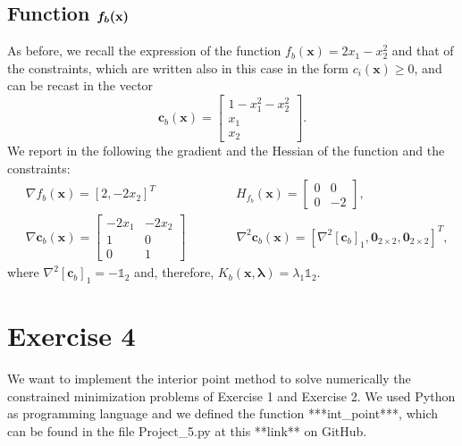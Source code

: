 \documentclass[a4paper,11pt]{article}
\begin{document}
\subsection*{Function $\boldmath{f_{b}}(\textbf{x})$}
As before, we recall the expression of the function $f_{b}(\textbf{x}) = 2x_{1} - x_{2}^{2}$ and that of the constraints, which are written also in this case in the form $c_{i}(\textbf{x})\ge0$, and can be recast in the vector
\begin{equation}
	\textbf{c}_{b}(\textbf{x}) = 
	\begin{bmatrix}
		1 -x_{1}^{2} - x_2^{2}\\
		x_1\\
		x_2
	\end{bmatrix}.
\end{equation}
We report in the following the gradient and the Hessian of the function and the constraints:
\begin{align}
	& \nabla f_{b}(\textbf{x}) = [2, -2x_{2}]^{T} \qquad \qquad \qquad \ \ H_{f_{b}}(\textbf{x}) = \begin{bmatrix}
		0 & 0 \\
		0 & -2
	\end{bmatrix}, \\
	& \nabla \textbf{c}_{b}(\textbf{x}) = \begin{bmatrix}
		-2x_{1} & - 2x_{2}\\
		1 & 0 \\
		0 & 1
	\end{bmatrix} \qquad \qquad \nabla^{2}{\textbf{c}_{b}}(\textbf{x}) =  \left[\nabla^{2}[\textbf{c}_{b}]_{1},\textbf{0}_{2\times2},\textbf{0}_{2\times2}\right]^{T},
\end{align}
where $\nabla^{2}[\textbf{c}_{b}]_{1} = -\mathbb{1}_{2}$ and, therefore, $K_{b}(\textbf{x},\boldsymbol{\lambda})=\lambda_{1}\mathbb{1}_{2}$.

\section*{Exercise 4}
We want to implement the interior point method to solve numerically the constrained minimization problems of Exercise 1 and Exercise 2. We used Python as programming language and we defined the function ***int\_point***, which can be found in the file Project\_5.py at this **link** on GitHub.\\
\end{document}
